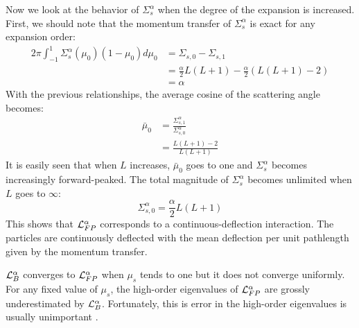 Now we look at the behavior of $\Sigma_s^{\alpha}$ when the degree of the expansion 
is increased. First, we should note that the momentum transfer of
$\Sigma_s^{\alpha}$ is exact for any expansion order:
\begin{equation}
\begin{split}
2\pi \int_{-1}^1 \Sigma_s^{\alpha}(\mu_0) (1-\mu_0) d\mu_0 &=
\Sigma_{s,0}-\Sigma_{s,1}\\
&=\frac{\alpha}{2} L(L+1) - \frac{\alpha}{2} (L(L+1)-2)\\
&=\alpha
\end{split}
\end{equation}
With the previous relationships, the average cosine of the scattering angle
becomes:
\begin{equation}
\begin{split}
\bar{\mu}_0 &= \frac{\Sigma_{s,1}^{\alpha}}{\Sigma_{s,0}^{\alpha}}\\
&=\frac{L(L+1)-2}{L(L+1)}
\end{split}
\end{equation}
It is easily seen that when $L$ increases, $\bar{\mu}_0$ goes to one and
$\Sigma_s^{\alpha}$ becomes increasingly forward-peaked. The
total magnitude of $\Sigma_s^{\alpha}$ becomes unlimited when $L$ goes to
$\infty$:
\begin{equation}
\Sigma_{s,0}^{\alpha} = \frac{\alpha}{2} L (L+1)
\end{equation}
This shows that $\mathcal{L}_{FP}^{\alpha}$ corresponds to a continuous-deflection 
interaction. The particles are continuously 
deflected with the mean deflection per unit pathlength given by the momentum transfer.

$\mathcal{L}_{B}^{\alpha}$ converges to $\mathcal{L}_{FP}^{\alpha}$ when $\mu_s$ tends
to one but it does not converge uniformly. For any fixed value of $\mu_s$, 
the high-order eigenvalues of $\mathcal{L}_{FP}^{\alpha}$ are grossly underestimated 
by $\mathcal{L}_B^{\alpha}$. Fortunately, this is error in the high-order eigenvalues 
is usually unimportant \cite{morel_96}.
